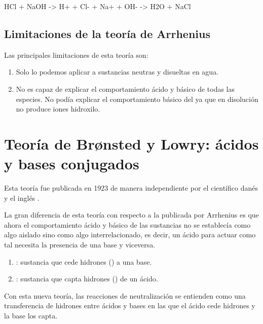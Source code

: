 \begin{reaction*}
    HCl + NaOH -> {\color{blue} H+} + \color{red} Cl- + Na+ + {\color{blue} OH-} \color{black} -> \color{blue} H2O \color{black} + \color{red} NaCl
\end{reaction*}

\subsection{Limitaciones de la teoría de Arrhenius}

Las principales limitaciones de esta teoría son:
\begin{enumerate}[label=\numberballmDarkTeal]
        \item Solo lo podemos aplicar a sustancias neutras y disueltas en agua.
        \item No es capaz de explicar el comportamiento ácido y básico de todas las especies. No podía explicar el comportamiento básico del  ya que en disolución no produce iones hidroxilo.
\end{enumerate}


\section{Teoría de Br\o{}nsted y Lowry: ácidos y bases conjugados}
Esta teoría fue publicada en \num{1923} de manera independiente por el científico danés  y el inglés .

La gran diferencia de esta teoría con respecto a la publicada por Arrhenius es que ahora el comportamiento ácido y básico de las sustancias no se establecía como algo aislado sino como algo interrelacionado, es decir, un ácido para actuar como tal necesita la presencia de una base y viceversa.

\begin{enumerate}[label=\numberballmDarkTeal]
        \item {}: sustancia que cede hidrones () a una base.
        \item {}: sustancia que capta hidrones () de un ácido.
\end{enumerate}

Con esta nueva teoría, las reacciones de neutralización se entienden como una transferencia de hidrones entre ácidos y bases en las que el ácido cede hidrones y la base los capta.
\begin{centeredequation}
\end{centeredequation}

